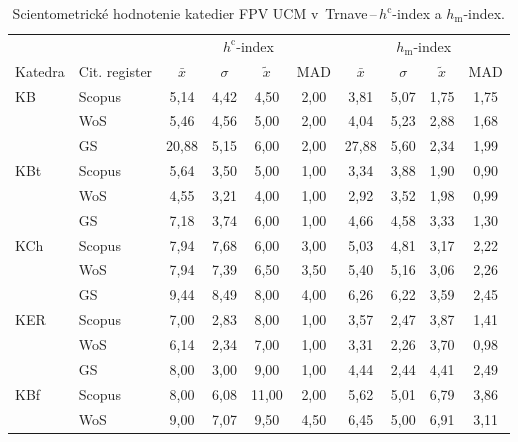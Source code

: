 \begin{table}
  \centering\small
  \caption[Hodnotenie FPV\,--\,$h^{\mathrm{c}}$-index a $h_{\mathrm{m}}$-index]{Scientometrické hodnotenie katedier FPV UCM v~Trnave\,--\,$h^{\mathrm{c}}$-index a $h_{\mathrm{m}}$-index.}
\label{tab:6-staff.results}
\begin{tabularx}{\textwidth}{XXcccc@{\hspace{3ex}}cccc}
  \toprule\noalign{\vspace{.3ex}}
       &      & \multicolumn{4}{c}{$h^{\mathrm{c}}$-index} & \multicolumn{4}{c}{$h_{\mathrm{m}}$-index} \\
 Katedra      & Cit. register& $\bar{x}$      & $\sigma$  & $\tilde{x}$ & MAD  & $\bar{x}$      & $\sigma$  & $\tilde{x}$  & MAD  \\[0.3ex]
  \midrule\noalign{\vspace{.5ex}}
 KB   & Scopus & 5,14     & 4,42 & 4,50  & 2,00 & 3,81     & 5,07 & 1,75 & 1,75 \\
      & WoS    & 5,46     & 4,56 & 5,00  & 2,00 & 4,04     & 5,23 & 2,88 & 1,68 \\
      & GS     & 20,88    & 5,15 & 6,00  & 2,00 & 27,88    & 5,60 & 2,34 & 1,99 \\[3ex]
 KBt  & Scopus & 5,64     & 3,50 & 5,00  & 1,00 & 3,34     & 3,88 & 1,90 & 0,90 \\
      & WoS    & 4,55     & 3,21 & 4,00  & 1,00 & 2,92     & 3,52 & 1,98 & 0,99 \\
      & GS     & 7,18     & 3,74 & 6,00  & 1,00 & 4,66     & 4,58 & 3,33 & 1,30 \\[3ex]
 KCh  & Scopus & 7,94     & 7,68 & 6,00  & 3,00 & 5,03     & 4,81 & 3,17 & 2,22 \\
      & WoS    & 7,94     & 7,39 & 6,50  & 3,50 & 5,40     & 5,16 & 3,06 & 2,26 \\
      & GS     & 9,44     & 8,49 & 8,00  & 4,00 & 6,26     & 6,22 & 3,59 & 2,45 \\[3ex]
 KER  & Scopus & 7,00     & 2,83 & 8,00  & 1,00 & 3,57     & 2,47 & 3,87 & 1,41 \\
      & WoS    & 6,14     & 2,34 & 7,00  & 1,00 & 3,31     & 2,26 & 3,70 & 0,98 \\
      & GS     & 8,00     & 3,00 & 9,00  & 1,00 & 4,44     & 2,44 & 4,41 & 2,49 \\[3ex]
 KBf  & Scopus & 8,00     & 6,08 & 11,00 & 2,00 & 5,62     & 5,01 & 6,79 & 3,86 \\
      & WoS    & 9,00     & 7,07 & 9,50  & 4,50 & 6,45     & 5,00 & 6,91 & 3,11 \\

\end{tabularx}
\end{table}
